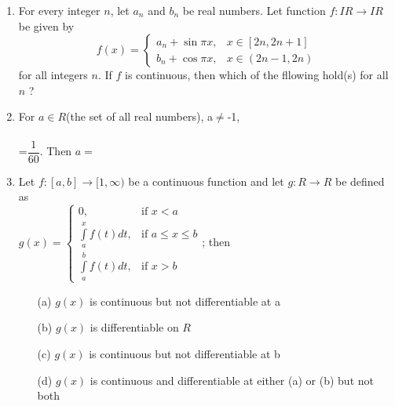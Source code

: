 \begin{enumerate}[label=\arabic*.,ref=\thesubsection.\theenumi]
\item For every integer $n$, let $a_n$ and $b_n$ be real numbers. Let function $f:IR \to IR$ be given by
$$f(x)=\begin{cases}
a_n+\sin\pi x, & \text{$x \in [2n, 2n+1]$}\\
b_n+\cos\pi x, & \text{$x \in (2n-1, 2n)$}
\end{cases}$$
for all integers $n$. If $f$ is continuous, then which of the fllowing hold(s) for all $n$ ?
\begin{itemize}
\end{itemize}

\item For $a \in R$(the set of all real numbers), a$\neq$-1,\\
\\=$\dfrac{1}{60}$. Then $a=$
\begin{itemize}
\end{itemize}

\item Let $f:[a,b] \to [1,\infty)$ be a continuous function and let $g:R \to R$ be defined as\\
$g(x)= \begin{cases}
0, & \text{if $x<a$}\\
\int\limits_a^xf(t)dt, & \text{if $a\leq x\leq b$}\\
\int\limits_a^bf(t)dt, & \text{if $x>b$} 
\end{cases}$; then
\begin{itemize}
\item[(a)] $g(x)$ is continuous but not differentiable at a
\item[(b)] $g(x)$ is differentiable on $R$
\item[(c)] $g(x)$ is continuous but not differentiable at b
\item[(d)] $g(x)$ is continuous and differentiable at either (a) or (b) but not both
\end{itemize}


\end{enumerate}
